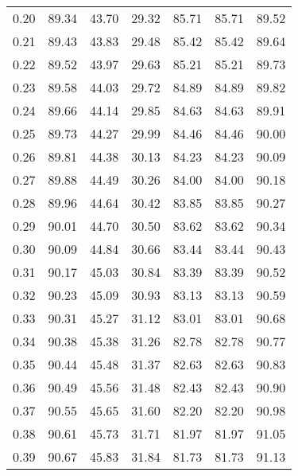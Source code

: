 \begin{tabular}{|c|c|c|c|c|c|c|}
      0.20 &     89.34 &     43.70 &      29.32 &   85.71 &      85.71 &         89.52 \\
      0.21 &     89.43 &     43.83 &      29.48 &   85.42 &      85.42 &         89.64 \\
      0.22 &     89.52 &     43.97 &      29.63 &   85.21 &      85.21 &         89.73 \\
      0.23 &     89.58 &     44.03 &      29.72 &   84.89 &      84.89 &         89.82 \\
      0.24 &     89.66 &     44.14 &      29.85 &   84.63 &      84.63 &         89.91 \\
      0.25 &     89.73 &     44.27 &      29.99 &   84.46 &      84.46 &         90.00 \\
      0.26 &     89.81 &     44.38 &      30.13 &   84.23 &      84.23 &         90.09 \\
      0.27 &     89.88 &     44.49 &      30.26 &   84.00 &      84.00 &         90.18 \\
      0.28 &     89.96 &     44.64 &      30.42 &   83.85 &      83.85 &         90.27 \\
      0.29 &     90.01 &     44.70 &      30.50 &   83.62 &      83.62 &         90.34 \\
      0.30 &     90.09 &     44.84 &      30.66 &   83.44 &      83.44 &         90.43 \\
      0.31 &     90.17 &     45.03 &      30.84 &   83.39 &      83.39 &         90.52 \\
      0.32 &     90.23 &     45.09 &      30.93 &   83.13 &      83.13 &         90.59 \\
      0.33 &     90.31 &     45.27 &      31.12 &   83.01 &      83.01 &         90.68 \\
      0.34 &     90.38 &     45.38 &      31.26 &   82.78 &      82.78 &         90.77 \\
      0.35 &     90.44 &     45.48 &      31.37 &   82.63 &      82.63 &         90.83 \\
      0.36 &     90.49 &     45.56 &      31.48 &   82.43 &      82.43 &         90.90 \\
      0.37 &     90.55 &     45.65 &      31.60 &   82.20 &      82.20 &         90.98 \\
      0.38 &     90.61 &     45.73 &      31.71 &   81.97 &      81.97 &         91.05 \\
      0.39 &     90.67 &     45.83 &      31.84 &   81.73 &      81.73 &         91.13 \\

\end{tabular}
